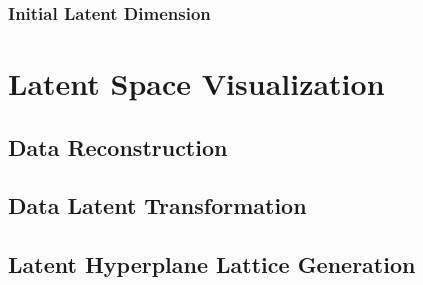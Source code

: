 \documentclass{article} %
\begin{document}
\subsubsection{Initial Latent Dimension}
%

\section{Latent Space Visualization}
\subsection{Data Reconstruction}
\subsection{Data Latent Transformation}
\subsection{Latent Hyperplane Lattice Generation}





\end{document}

